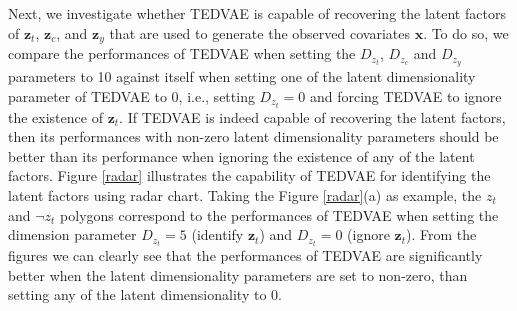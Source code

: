 \documentclass[letterpaper]{article} %
\begin{document}
Next, we investigate whether TEDVAE is capable of recovering the latent factors of $\mathbf{z}_t$, $\mathbf{z}_c$, and $\mathbf{z}_y$ that are used to generate the observed covariates $\mathbf{x}$. To do so, we compare the performances of TEDVAE when setting the $D_{z_t}$, $D_{z_c}$ and $D_{z_y}$ parameters to 10 against itself when setting one of the latent dimensionality parameter of TEDVAE to $0$, i.e., setting $D_{z_t}=0$ and forcing TEDVAE to ignore the existence of $\mathbf{z}_t$. If TEDVAE is indeed capable of recovering the latent factors, then its performances with non-zero latent dimensionality parameters should be better than its performance when ignoring the existence of any of the latent factors.
Figure \ref{radar} illustrates the capability of TEDVAE for identifying the latent factors using radar chart. Taking the Figure \ref{radar}(a) as example, the $z_t$ and $\neg z_t$ polygons correspond to the performances of TEDVAE when setting the dimension parameter $D_{z_t}=5$ (identify $\mathbf{z}_t$) and $D_{z_t}=0$ (ignore $\mathbf{z}_t$). From the figures we can clearly see that the performances of TEDVAE are significantly better when the latent dimensionality parameters are set to non-zero, than setting any of the latent dimensionality to 0.
\end{document}
